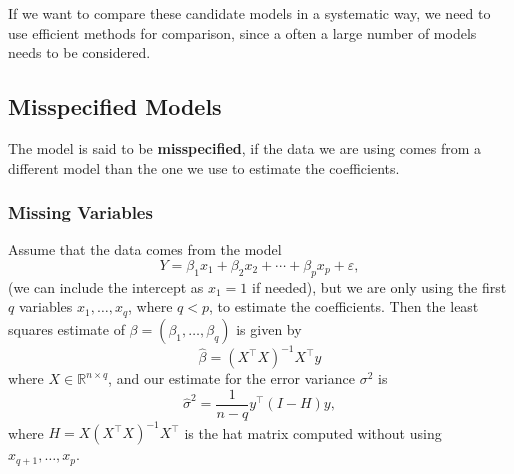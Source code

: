 \documentclass[
  a4paper,
]{article}
\theoremstyle{definition}
\theoremstyle{definition}
\theoremstyle{definition}
\theoremstyle{definition}
\theoremstyle{remark}
\begin{document}
If we want to compare these candidate models in a systematic way,
we need to use efficient methods for comparison, since a often a large
number of models needs to be considered.

\hypertarget{misspecified-models}{%
\subsection{Misspecified Models}\label{misspecified-models}}

The model is said to be \textbf{misspecified}, if the data we are using
comes from a different model than the one we use to estimate
the coefficients.

\hypertarget{missing-variables}{%
\subsubsection{Missing Variables}\label{missing-variables}}

Assume that the data comes from the model
\begin{equation*}
  Y = \beta_1 x_1 + \beta_2 x_2 + \cdots + \beta_p x_p + \varepsilon,
\end{equation*}
(we can include the intercept as \(x_1 = 1\) if needed),
but we are only using the first \(q\) variables \(x_1, \ldots, x_q\),
where \(q < p\), to estimate the coefficients. Then the least squares
estimate of \(\beta = (\beta_1, \ldots, \beta_q)\) is given by
\begin{equation*}
  \hat\beta
  = (X^\top X)^{-1} X^\top y
\end{equation*}
where \(X \in \mathbb{R}^{n\times q}\),
and our estimate for the error variance \(\sigma^2\) is
\begin{equation*}
  \hat\sigma^2
  = \frac{1}{n-q} y^\top (I - H) y,
\end{equation*}
where \(H = X (X^\top X)^{-1} X^\top\) is the hat matrix computed
without using \(x_{q+1}, \ldots, x_p\).
\end{document}
